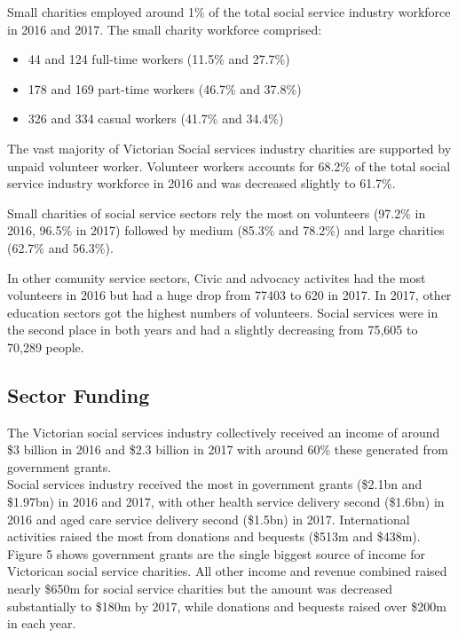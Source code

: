 \documentclass[
  11pt,
]{article}
\providecommand{\tightlist}{%
  \setlength{\itemsep}{0pt}\setlength{\parskip}{0pt}}
\begin{document}
Small charities employed around 1\% of the total social service industry workforce in 2016 and 2017. The small charity workforce comprised:

\begin{itemize}
\tightlist
\item
  44 and 124 full-time workers (11.5\% and 27.7\%)
\item
  178 and 169 part-time workers (46.7\% and 37.8\%)
\item
  326 and 334 casual workers (41.7\% and 34.4\%)
\end{itemize}

The vast majority of Victorian Social services industry charities are supported by unpaid volunteer worker. Volunteer workers accounts for 68.2\% of the total social service industry workforce in 2016 and was decreased slightly to 61.7\%.

Small charities of social service sectors rely the most on volunteers (97.2\% in 2016, 96.5\% in 2017) followed by medium (85.3\% and 78.2\%) and large charities (62.7\% and 56.3\%).

In other comunity service sectors, Civic and advocacy activites had the most volunteers in 2016 but had a huge drop from 77403 to 620 in 2017. In 2017, other education sectors got the highest numbers of volunteers. Social services were in the second place in both years and had a slightly decreasing from 75,605 to 70,289 people.

\hypertarget{sector-funding}{%
\subsection{Sector Funding}\label{sector-funding}}

The Victorian social services industry collectively received an income of around \$3 billion in 2016 and
\$2.3 billion in 2017 with around 60\% these generated from government grants.\\
Social services industry received the most in government grants (\$2.1bn and \$1.97bn) in 2016 and 2017, with other health service delivery second (\$1.6bn) in 2016 and aged care service delivery second (\$1.5bn) in 2017. International activities raised the most from donations and bequests (\$513m and \$438m).\\
Figure 5 shows government grants are the single biggest source of income for Victorican social service charities. All other income and revenue combined raised nearly \$650m for social service charities but the amount was decreased substantially to \$180m by 2017, while donations and bequests raised over \$200m in each year.
\end{document}
